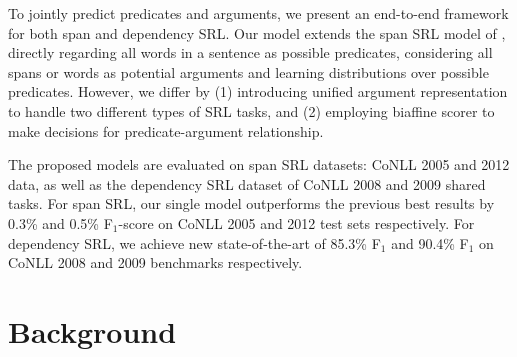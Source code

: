\documentclass[letterpaper]{article} %
\begin{document}





To jointly predict predicates and arguments, we present an end-to-end framework for both span and dependency SRL. Our model extends the span SRL model of \citeauthor{he2018jointly} , directly regarding all words in a sentence as possible predicates, considering all spans or words as potential arguments and learning distributions over possible predicates. However, we differ by (1) introducing unified argument representation to handle two different types of SRL tasks, and (2) employing biaffine scorer to make decisions for predicate-argument relationship. 



The proposed models are evaluated on span SRL datasets: CoNLL 2005 and 2012 data, as well as the dependency SRL dataset of CoNLL 2008 and 2009 shared tasks. For span SRL, our single model outperforms the previous best results by 0.3\% and 0.5\% F$_1$-score on CoNLL 2005 and 2012 test sets respectively. For dependency SRL, we achieve new state-of-the-art of 85.3\% F$_1$ and 90.4\% F$_1$ on CoNLL 2008 and 2009 benchmarks respectively. 
%
%
%




\section{Background}
\end{document}
